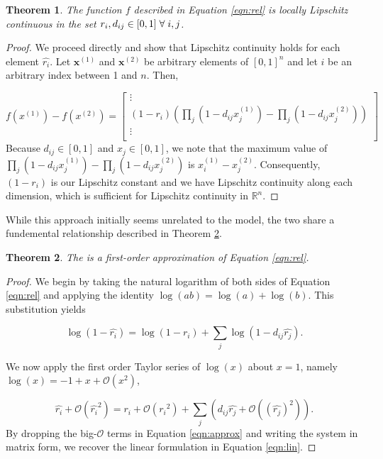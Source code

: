 \documentclass{article}
\newtheorem{thm}{Theorem}
\begin{document}
\begin{thm}
\label{thm:lipschitz}
The function $f$ described in Equation \ref{eqn:rel} is locally Lipschitz continuous in the set $r_i, d_{ij} \in [0,1] \hspace{1mm} \forall \hspace{1mm} i,j$.
\end{thm}
\begin{proof}
We proceed directly and show that Lipschitz continuity holds for each element $\hat{r_i}$. Let $\mathbf{x}^{(1)}$ and $\mathbf{x}^{(2)}$ be arbitrary elements of $[0,1]^n$ and let $i$ be an arbitrary index between 1 and $n$. Then, 

\begin{equation}
f\left(x^{(1)}\right) - f\left(x^{(2)}\right) = 
\begin{bmatrix}
\vdots \\
(1-r_i)\left( \prod_j \left(1-d_{ij} x_j^{(1)} \right) -  \prod_j \left(1-d_{ij} x_j^{(2)} \right) \right)\\
\vdots\\
\end{bmatrix}
\end{equation}
Because $d_{ij}\in [0,1]$ and $x_{j}\in [0,1]$, we note that the maximum value of $\prod_j \left(1-d_{ij} x_j^{(1)} \right) -  \prod_j \left(1-d_{ij} x_j^{(2)} \right)$ is $x_i^{(1)} - x_j^{(2)}$. Consequently, $(1-r_i)$ is our Lipschitz constant and we have Lipschitz continuity along each dimension, which is sufficient for Lipschitz continuity in $\mathbb{R}^n$.
\end{proof}

While this approach initially seems unrelated to the \citeauthor{haimes-iiom} model, the two share a fundemental relationship described in Theorem \ref{thm:first-order}. 
\begin{thm}
\label{thm:first-order}
The \citeauthor{haimes-iiom} is a first-order approximation of Equation \ref{eqn:rel}.
\end{thm}
\begin{proof}
We begin by taking the natural logarithm of both sides of Equation \ref{eqn:rel} and applying the identity $\log(ab) = \log(a) + \log(b)$. This substitution yields

\begin{equation}
\log(1-\hat{r_i}) = \log(1-r_i) + \sum_j \log( 1-d_{ij}\hat{r_j}).
\end{equation}

We now apply the first order Taylor series of $\log(x)$ about $x=1$, namely $\log(x) = -1 + x + \mathcal{O}\left(x^2\right)$,

\begin{equation}
\label{eqn:approx}
\hat{r_i} + \mathcal{O}(\hat{r_i}^2) = {r_i} + \mathcal{O}\left({r_i}^2\right) + \sum_j \left(d_{ij}\hat{r_j} + \mathcal{O}\left((\hat{r_j})^2 \right)\right).
\end{equation}
By dropping the big-$\mathcal{O}$ terms in Equation \ref{eqn:approx} and writing the system in matrix form, we recover the linear formulation in Equation \ref{eqn:lin}.
\end{proof}
\end{document}

